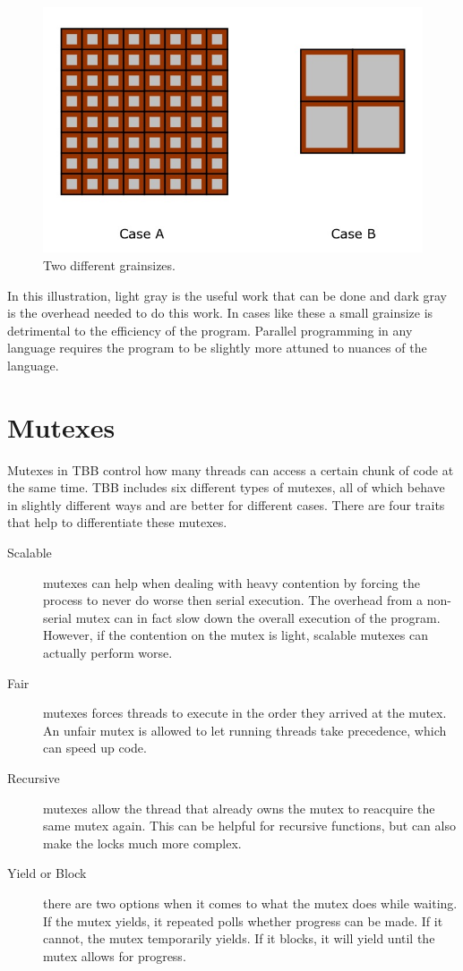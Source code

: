 \documentclass{article}
\begin{document}
  \begin{figure}[H]
  \centering
  \includegraphics[scale=.65]{pic/Grainsize.jpg}
  \caption{Two different grainsizes.}
  \end{figure}

  In this illustration, light gray is the useful work that can be done and dark gray is the overhead needed to do this work. In cases like these a small grainsize is detrimental to the efficiency of the program. Parallel programming in any language requires the program to be slightly more attuned to nuances of the language.


  \section{Mutexes}
  Mutexes in TBB control how many threads can access a certain chunk of code at the same time. TBB includes six different types of mutexes, all of which behave in slightly different ways and are better for different cases. There are four traits that help to differentiate these mutexes. 

  \begin{description}
  \item[Scalable] mutexes can help when dealing with heavy contention by forcing the process to never do worse then serial execution. The overhead from a non-serial mutex can in fact slow down the overall execution of the program. However, if the contention on the mutex is light, scalable mutexes can actually perform worse.
  \item[Fair] mutexes forces threads to execute in the order they arrived at the mutex. An unfair mutex is allowed to let running threads take precedence, which can speed up code.
  \item[Recursive] mutexes allow the thread that already owns the mutex to reacquire the same mutex again. This can be helpful for recursive functions, but can also make the locks much more complex.
  \item[Yield or Block] there are two options when it comes to what the mutex does while waiting. If the mutex yields, it repeated polls whether progress can be made. If it cannot, the mutex temporarily yields. If it blocks, it will yield until the mutex allows for progress.
  \end{description}
\end{document}
